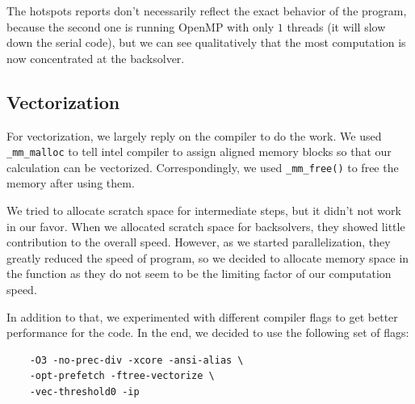 \documentclass[a4paper,11pt]{article}
\begin{document}
\begin{multicols}{2}
The hotspots reports don't necessarily reflect the exact behavior of the program, because the second one is running OpenMP with only $1$ threads (it will slow down the serial code), but we can see qualitatively that the most computation is now concentrated at the backsolver.
	\subsection{Vectorization}
	For vectorization, we largely reply on the compiler to do the work. We used \verb|_mm_malloc| to tell intel compiler to assign aligned memory blocks so that our calculation can be vectorized. Correspondingly, we used \verb|_mm_free()| to free the memory after using them.
	\par We tried to allocate scratch space for intermediate steps, but it didn't not work in our favor. When we allocated scratch space for backsolvers, they showed little contribution to the overall speed. However, as we started parallelization, they greatly reduced the speed of program, so we decided to allocate memory space in the function as they do not seem to be the limiting factor of our computation speed.
	\par In addition to that, we experimented with different compiler flags to get better performance for the code. In the end, we decided to use the following set of flags:
	\begin{center}
	\begin{verbatim}
	-O3 -no-prec-div -xcore -ansi-alias \
	-opt-prefetch -ftree-vectorize \
	-vec-threshold0 -ip
	\end{verbatim}
	\end{center}

\end{multicols}
\end{document}
